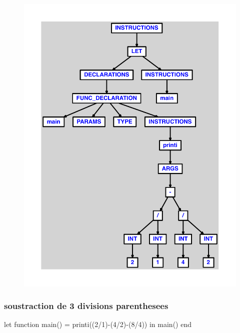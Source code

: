 \documentclass{article}
\begin{document}
\begin{figure}[H]\centering\includegraphics[max width=\textwidth]{ast/ast_109.pdf}\end{figure}\subsubsection{soustraction de 3 divisions parenthesees}
\begin{verbatimtab}
let function main() = printi((2/1)-(4/2)-(8/4)) in main() end
\end{verbatimtab}
\end{document}
